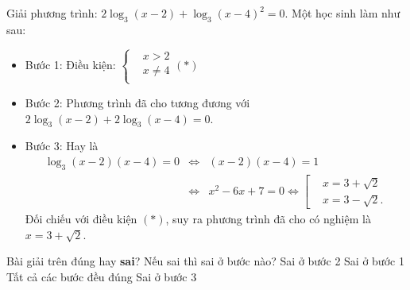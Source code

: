 \begin{ex}%
	Giải phương trình: $2\log_3(x-2)+\log_3(x-4)^2=0$. Một học sinh làm như sau:
	\begin{itemize}
		\item Bước 1: Điều kiện: $\left\{\begin{aligned}&x>2 \\ &x\ne 4  \\ \end{aligned}\right.(*)$ 
		\item Bước 2: Phương trình đã cho tương đương với $2\log_3(x-2)+2\log_3(x-4)=0$.
		\item Bước 3: Hay là \begin{eqnarray*}
			\log_3(x-2)(x-4)=0&\Leftrightarrow& (x-2)(x-4)=1\\
			&\Leftrightarrow& x^2-6x+7=0\Leftrightarrow \left[\begin{aligned}&x=3+\sqrt{2} \\ &x=3-\sqrt{2}. \end{aligned}\right.
		\end{eqnarray*}
		Đối chiếu với điều kiện $(*)$, suy ra phương trình đã cho có nghiệm là $x=3+\sqrt{2}$.
	\end{itemize}
	Bài giải trên đúng hay \textbf{sai}? Nếu sai thì sai ở bước nào? 
	\choice
	{\True Sai ở bước 2}
	{Sai ở bước 1}
	{Tất cả các bước đều đúng}
	{Sai ở bước 3}
\end{ex}
